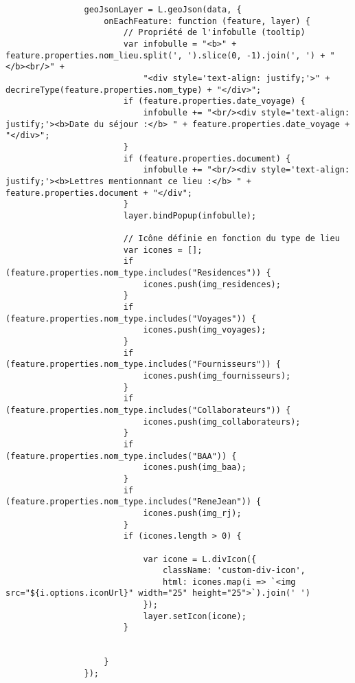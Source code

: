 \begin{verbatim}
                geoJsonLayer = L.geoJson(data, {
                    onEachFeature: function (feature, layer) {
                        // Propriété de l'infobulle (tooltip)
                        var infobulle = "<b>" + feature.properties.nom_lieu.split(', ').slice(0, -1).join(', ') + "</b><br/>" +
                            "<div style='text-align: justify;'>" + decrireType(feature.properties.nom_type) + "</div>";
                        if (feature.properties.date_voyage) {
                            infobulle += "<br/><div style='text-align: justify;'><b>Date du séjour :</b> " + feature.properties.date_voyage + "</div>";
                        }
                        if (feature.properties.document) {
                            infobulle += "<br/><div style='text-align: justify;'><b>Lettres mentionnant ce lieu :</b> " + feature.properties.document + "</div";
                        }
                        layer.bindPopup(infobulle);

                        // Icône définie en fonction du type de lieu
                        var icones = [];
                        if (feature.properties.nom_type.includes("Residences")) {
                            icones.push(img_residences);
                        }
                        if (feature.properties.nom_type.includes("Voyages")) {
                            icones.push(img_voyages);
                        }
                        if (feature.properties.nom_type.includes("Fournisseurs")) {
                            icones.push(img_fournisseurs);
                        }
                        if (feature.properties.nom_type.includes("Collaborateurs")) {
                            icones.push(img_collaborateurs);
                        }
                        if (feature.properties.nom_type.includes("BAA")) {
                            icones.push(img_baa);
                        }
                        if (feature.properties.nom_type.includes("ReneJean")) {
                            icones.push(img_rj);
                        }
                        if (icones.length > 0) {
                            
                            var icone = L.divIcon({
                                className: 'custom-div-icon',
                                html: icones.map(i => `<img src="${i.options.iconUrl}" width="25" height="25">`).join(' ')
                            });
                            layer.setIcon(icone);
                        }


                    }
                });


\end{verbatim}
